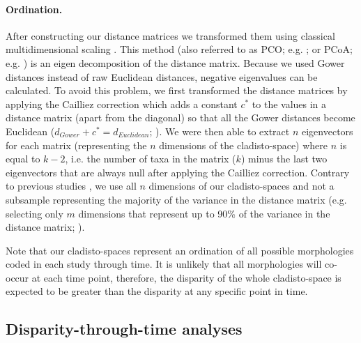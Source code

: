 \documentclass[12pt,a4paper]{article}
\begin{document}
\paragraph{Ordination.}
After constructing our distance matrices we transformed them using classical multidimensional scaling \citep[MDS;][]{torgerson1965multidimensional,GOWER01121966,cailliez1983analytical}.
This method (also referred to as PCO; e.g. \citealt{Brusatte2015}; or PCoA; e.g. \citealt{paradisape:2004}) is an eigen decomposition of the distance matrix.
Because we used Gower distances instead of raw Euclidean distances, negative eigenvalues can be calculated.
To avoid this problem, we first transformed the distance matrices by applying the Cailliez correction \citep{cailliez1983analytical} which adds a constant $c^*$ to the values in a distance matrix (apart from the diagonal) so that all the Gower distances become Euclidean ($d_{Gower}+c^*=d_{Euclidean}$; \citealt{cailliez1983analytical}). 
We were then able to extract $n$ eigenvectors for each matrix (representing the $n$ dimensions of the cladisto-space) where $n$ is equal to $k-2$, i.e. the number of taxa in the matrix ($k$) minus the last two eigenvectors that are always null after applying the Cailliez correction.
Contrary to previous studies \citep[e.g][]{brusatte50,cisneros2010,prentice2011,anderson2012using,Hughes20082013,bentonmodels2014}, we use all $n$ dimensions of our cladisto-spaces and not a subsample representing the majority of the variance in the distance matrix (e.g. selecting only $m$ dimensions that represent up to 90\% of the variance in the distance matrix; \citealt{Brusatte12092008,toljagictriassic-jurassic2013}).

Note that our cladisto-spaces represent an ordination of all possible morphologies coded in each study through time.
It is unlikely that all morphologies will co-occur at each time point, therefore, the disparity of the whole cladisto-space is expected to be greater than the disparity at any specific point in time.

\subsection{Disparity-through-time analyses}
\label{disparity_calc}
\end{document}
